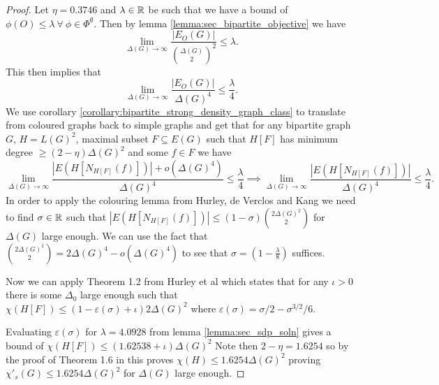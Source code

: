 \begin{proof}
    Let $\eta = 0.3746$ and $\lambda\in\mathbb{R}$ be such that we have a bound of
    $\phi(O) \leq \lambda\ \forall\ \phi\in\Phi^\emptyset$.
    Then by lemma \ref{lemma:sec_bipartite_objective} we have
    \[
        \lim_{\Delta(G) \to \infty}
        \frac{|E_O(G)|}{\binom{\Delta(G)}{2}^2}
        \leq \lambda.
    \]
    This then implies that
    \[
        \lim_{\Delta(G) \to \infty}
        \frac{|E_O(G)|}{\Delta(G)^4}
        \leq \frac{\lambda}{4}.
    \]
    We use corollary \ref{corollary:bipartite_strong_density_graph_class} to translate from
    coloured graphs back to simple graphs and get that for any bipartite graph $G$,
    $H = L(G)^2$, maximal subset $F\subseteq E(G)$ such that $H[F]$ has minimum degree
    $\geq (2-\eta)\Delta(G)^2$ and some $f\in F$ we have
    \[
        \lim_{\Delta(G) \to \infty}
        \frac{|E(H[N_{H[F]}(f)])| + o(\Delta(G)^4)}{\Delta(G)^4}
        \leq \frac{\lambda}{4}
        \implies
        \lim_{\Delta(G) \to \infty}
        \frac{|E(H[N_{H[F]}(f)])|}{\Delta(G)^4}
        \leq \frac{\lambda}{4}.
    \]
    In order to apply the colouring lemma from Hurley, de Verclos and Kang
    \cite{hurleyImprovedProcedureColouring2022} we need to find $\sigma\in\mathbb{R}$ such that
    $|E(H[N_{H[F]}(f)])| \leq (1-\sigma)\binom{2\Delta(G)^2}{2}$ for $\Delta(G)$ large
    enough. We can use the fact that
    $\binom{2\Delta(G)^2}{2} = 2\Delta(G)^4 - o(\Delta(G)^4)$
    to see that $\sigma = (1-\frac{\lambda}{8})$ suffices.

    Now we can apply Theorem 1.2 from Hurley et al \cite{hurleyImprovedProcedureColouring2022}
    which states that for any $\iota > 0$ there is some $\Delta_0$ large enough such that
    $\chi(H[F]) \leq (1-\varepsilon(\sigma) + \iota)2\Delta(G)^2$
    where $\varepsilon(\sigma) = \sigma/2 - \sigma^{3/2}/6$.

    Evaluating $\varepsilon(\sigma)$ for $\lambda = 4.0928$ from 
    lemma \ref{lemma:sec_sdp_soln} gives a bound of
    $\chi(H[F]) \leq (1.62538 + \iota)\Delta(G)^2$
    Note then $2-\eta = 1.6254$ so by the proof of Theorem 1.6 in
    \cite{hurleyImprovedProcedureColouring2022}
    this proves $\chi(H) \leq 1.6254\Delta(G)^2$ proving
    $\chi'_s(G) \leq 1.6254\Delta(G)^2$ for $\Delta(G)$ large enough.
\end{proof}
